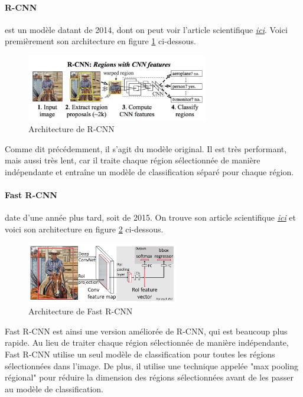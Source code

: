 \paragraph{R-CNN} est un modèle datant de 2014, dont on peut voir l'article scientifique \href{https://arxiv.org/pdf/1311.2524.pdf}{\textit{ici}}. Voici premièrement son architecture en figure \ref{fig:rcnn_architecture} ci-dessous.

\begin{figure}[H]
    \centering
    \includegraphics[width=300px]{images/model_rcnn_architecture.png}
    \caption{Architecture de R-CNN}
    \label{fig:rcnn_architecture}
\end{figure}

Comme dit précédemment, il s'agit du modèle original. Il est très performant, mais aussi très lent, car il traite chaque région sélectionnée de manière indépendante et entraîne un modèle de classification séparé pour chaque région.


\paragraph{Fast R-CNN} date d'une année plus tard, soit de 2015. On trouve son article scientifique \href{https://arxiv.org/pdf/1504.08083.pdf}{\textit{ici}} et voici son architecture en figure \ref{fig:fastRcnn_architecture} ci-dessous.

\begin{figure}[H]
    \centering
    \includegraphics[width=250px]{images/model_fastRcnn_architecture.png}
    \caption{Architecture de Fast R-CNN}
    \label{fig:fastRcnn_architecture}
\end{figure}

Fast R-CNN est ainsi une version améliorée de R-CNN, qui est beaucoup plus rapide. Au lieu de traiter chaque région sélectionnée de manière indépendante, Fast R-CNN utilise un seul modèle de classification pour toutes les régions sélectionnées dans l'image. De plus, il utilise une technique appelée "max pooling régional" pour réduire la dimension des régions sélectionnées avant de les passer au modèle de classification.

